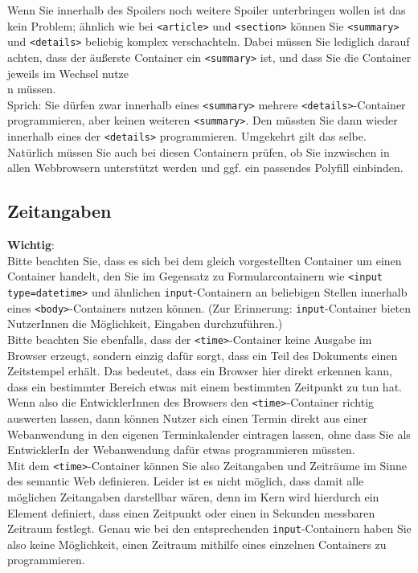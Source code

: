 Wenn Sie innerhalb des \glqq{}Spoilers\grqq{} noch weitere Spoiler unterbringen wollen ist das kein Problem; ähnlich wie bei \verb|<article>| und \verb|<section>| können Sie \verb|<summary>| und \verb|<details>| beliebig komplex verschachteln. Dabei müssen Sie lediglich darauf achten, dass der äußerste Container ein \verb|<summary>| ist, und dass Sie die Container jeweils im Wechsel nutze\\n müssen.\\

Sprich: Sie dürfen zwar innerhalb eines \verb|<summary>| mehrere \verb|<details>|-Container programmieren, aber keinen weiteren \verb|<summary>|. Den müssten Sie dann wieder innerhalb eines der \verb|<details>| programmieren. Umgekehrt gilt das selbe.\\

Natürlich müssen Sie auch bei diesen Containern prüfen, ob Sie inzwischen in allen Webbrowsern unterstützt werden und ggf. ein passendes Polyfill einbinden.

\subsection{Zeitangaben}

\textbf{Wichtig}:\\

Bitte beachten Sie, dass es sich bei dem gleich vorgestellten Container um einen Container handelt, den Sie im Gegensatz zu Formularcontainern wie \verb|<input type=datetime>| und ähnlichen \verb|input|-Containern an beliebigen Stellen innerhalb eines \verb|<body>|-Containers nutzen können. (Zur Erinnerung: \verb|input|-Container bieten NutzerInnen die Möglichkeit, Eingaben durchzuführen.)\\

Bitte beachten Sie ebenfalls, dass der \verb|<time>|-Container keine Ausgabe im Browser erzeugt, sondern einzig dafür sorgt, dass ein Teil des Dokuments einen Zeitstempel erhält. Das bedeutet, dass ein Browser hier direkt erkennen kann, dass ein bestimmter Bereich etwas mit einem bestimmten Zeitpunkt zu tun hat. Wenn also die EntwicklerInnen des Browsers den \verb|<time>|-Container richtig auswerten lassen, dann können Nutzer sich einen Termin direkt aus einer Webanwendung in den eigenen Terminkalender eintragen lassen, ohne dass Sie als EntwicklerIn der Webanwendung dafür etwas programmieren müssten.\\

Mit dem \verb|<time>|-Container können Sie also Zeitangaben und Zeiträume im Sinne des semantic Web definieren. Leider ist es nicht möglich, dass damit alle möglichen Zeitangaben darstellbar wären, denn im Kern wird hierdurch ein Element definiert, dass einen Zeitpunkt oder einen in Sekunden messbaren Zeitraum festlegt. Genau wie bei den entsprechenden \verb|input|-Containern haben Sie also keine Möglichkeit, einen Zeitraum mithilfe eines einzelnen Containers zu programmieren.\\

